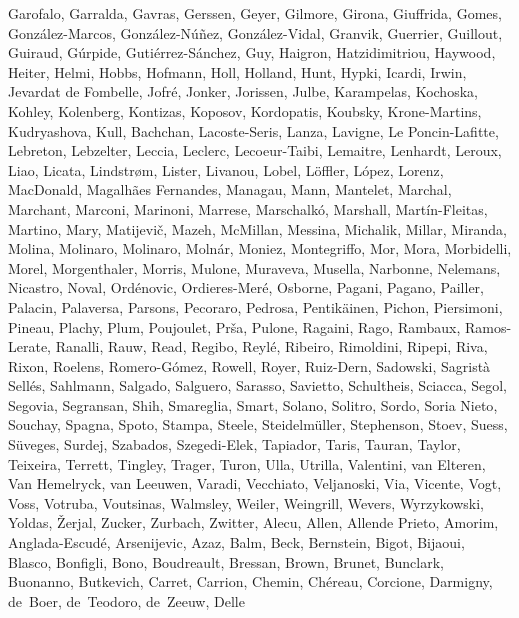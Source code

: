 \documentclass[apj, revtex4-1]{emulateapj}
\begin{document}
\begin{thebibliography}{}
{  Garofalo, Garralda, Gavras, Gerssen, Geyer, Gilmore, Girona, Giuffrida,
  Gomes, Gonz{\'{a}}lez-Marcos, Gonz{\'{a}}lez-N{\'{u}}{\~{n}}ez,
  Gonz{\'{a}}lez-Vidal, Granvik, Guerrier, Guillout, Guiraud, G{\'{u}}rpide,
  Guti{\'{e}}rrez-S{\'{a}}nchez, Guy, Haigron, Hatzidimitriou, Haywood, Heiter,
  Helmi, Hobbs, Hofmann, Holl, Holland, Hunt, Hypki, Icardi, Irwin, {Jevardat
  de Fombelle}, Jofr{\'{e}}, Jonker, Jorissen, Julbe, Karampelas, Kochoska,
  Kohley, Kolenberg, Kontizas, Koposov, Kordopatis, Koubsky, Krone-Martins,
  Kudryashova, Kull, Bachchan, Lacoste-Seris, Lanza, Lavigne, {Le
  Poncin-Lafitte}, Lebreton, Lebzelter, Leccia, Leclerc, Lecoeur-Taibi,
  Lemaitre, Lenhardt, Leroux, Liao, Licata, Lindstr{\o}m, Lister, Livanou,
  Lobel, L{\"{o}}ffler, L{\'{o}}pez, Lorenz, MacDonald, {Magalh{\~{a}}es
  Fernandes}, Managau, Mann, Mantelet, Marchal, Marchant, Marconi, Marinoni,
  Marrese, Marschalk{\'{o}}, Marshall, Mart{\'{i}}n-Fleitas, Martino, Mary,
  Matijevi{\v{c}}, Mazeh, McMillan, Messina, Michalik, Millar, Miranda, Molina,
  Molinaro, Molinaro, Moln{\'{a}}r, Moniez, Montegriffo, Mor, Mora, Morbidelli,
  Morel, Morgenthaler, Morris, Mulone, Muraveva, Musella, Narbonne, Nelemans,
  Nicastro, Noval, Ord{\'{e}}novic, Ordieres-Mer{\'{e}}, Osborne, Pagani,
  Pagano, Pailler, Palacin, Palaversa, Parsons, Pecoraro, Pedrosa,
  Pentik{\"{a}}inen, Pichon, Piersimoni, Pineau, Plachy, Plum, Poujoulet,
  Pr{\v{s}}a, Pulone, Ragaini, Rago, Rambaux, Ramos-Lerate, Ranalli, Rauw,
  Read, Regibo, Reyl{\'{e}}, Ribeiro, Rimoldini, Ripepi, Riva, Rixon, Roelens,
  Romero-G{\'{o}}mez, Rowell, Royer, Ruiz-Dern, Sadowski, {Sagrist{\`{a}}
  Sell{\'{e}}s}, Sahlmann, Salgado, Salguero, Sarasso, Savietto, Schultheis,
  Sciacca, Segol, Segovia, Segransan, Shih, Smareglia, Smart, Solano, Solitro,
  Sordo, {Soria Nieto}, Souchay, Spagna, Spoto, Stampa, Steele,
  Steidelm{\"{u}}ller, Stephenson, Stoev, Suess, S{\"{u}}veges, Surdej,
  Szabados, Szegedi-Elek, Tapiador, Taris, Tauran, Taylor, Teixeira, Terrett,
  Tingley, Trager, Turon, Ulla, Utrilla, Valentini, van Elteren, {Van
  Hemelryck}, van Leeuwen, Varadi, Vecchiato, Veljanoski, Via, Vicente, Vogt,
  Voss, Votruba, Voutsinas, Walmsley, Weiler, Weingrill, Wevers, Wyrzykowski,
  Yoldas, {\v{Z}}erjal, Zucker, Zurbach, Zwitter, Alecu, Allen, {Allende
  Prieto}, Amorim, Anglada-Escud{\'{e}}, Arsenijevic, Azaz, Balm, Beck,
  Bernstein, Bigot, Bijaoui, Blasco, Bonfigli, Bono, Boudreault, Bressan,
  Brown, Brunet, Bunclark, Buonanno, Butkevich, Carret, Carrion, Chemin,
  Ch{\'{e}}reau, Corcione, Darmigny, de~Boer, de~Teodoro, de~Zeeuw, {Delle
}}
\end{thebibliography}
\end{document}
